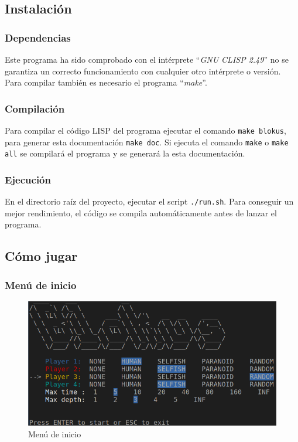 \subsection{Instalación}
\subsubsection{Dependencias}
Este programa ha sido comprobado con el intérprete  ``\textsl{GNU CLISP 2.49}''
no se garantiza un correcto funcionamiento con cualquier otro intérprete o
versión. Para compilar también es necesario el programa ``\textsl{make}''.

\subsubsection{Compilación}
Para compilar el código LISP del programa ejecutar el comando \texttt{make
blokus}, para generar esta documentación \texttt{make doc}. Si ejecuta el
comando \texttt{make} o \texttt{make all} se compilará el programa y se generará
la esta documentación.

\subsubsection{Ejecución} En el directorio raíz del proyecto, ejecutar el script
\texttt{./run.sh}. Para conseguir un mejor rendimiento, el código se compila
automáticamente antes de lanzar el programa.

\clearpage
\subsection{Cómo jugar}
\subsubsection{Menú de inicio}
\begin{figure}[ht]
	\centering
	\includegraphics[width=\textwidth, keepaspectratio]{img/tui-init}
	\caption{Menú de inicio}
	\label{fig:menu_inicio}
\end{figure}

